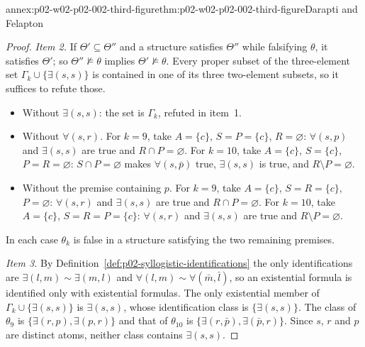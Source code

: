 \begin{annexitem}{annex:p02-w02-p02-002-third-figure}{thm:p02-w02-p02-002-third-figure}{Darapti and Felapton}
\begin{proof}
\emph{Item 2.} If \(\Theta'\subseteq\Theta''\) and a structure satisfies
\(\Theta''\) while falsifying \(\theta\), it satisfies \(\Theta'\); so
\(\Theta''\not\models\theta\) implies \(\Theta'\not\models\theta\). Every
proper subset of the three-element set
\(\Gamma_k\cup\{\exists(s,s)\}\) is contained in one of its three
two-element subsets, so it suffices to refute those.
\begin{itemize}
\item Without \(\exists(s,s)\): the set is \(\Gamma_k\), refuted in item~1.
\item Without \(\forall(s,r)\). For \(k=9\), take \(A=\{c\}\), \(S=P=\{c\}\),
 \(R=\varnothing\): \(\forall(s,p)\) and \(\exists(s,s)\) are true and
 \(R\cap P=\varnothing\). For \(k=10\), take \(A=\{c\}\), \(S=\{c\}\),
 \(P=R=\varnothing\): \(S\cap P=\varnothing\) makes \(\forall(s,\bar p)\)
 true, \(\exists(s,s)\) is true, and \(R\setminus P=\varnothing\).
\item Without the premise containing \(p\). For \(k=9\), take \(A=\{c\}\),
 \(S=R=\{c\}\), \(P=\varnothing\): \(\forall(s,r)\) and \(\exists(s,s)\) are
 true and \(R\cap P=\varnothing\). For \(k=10\), take \(A=\{c\}\),
 \(S=R=P=\{c\}\): \(\forall(s,r)\) and \(\exists(s,s)\) are true and
 \(R\setminus P=\varnothing\).
\end{itemize}
In each case \(\theta_k\) is false in a structure satisfying the two
remaining premises.

\emph{Item 3.} By Definition~\ref{def:p02-syllogistic-identifications} the
only identifications are \(\exists(l,m)\sim\exists(m,l)\) and
\(\forall(l,m)\sim\forall(\bar m,\bar l)\), so an existential formula is
identified only with existential formulas. The only existential member of
\(\Gamma_k\cup\{\exists(s,s)\}\) is \(\exists(s,s)\), whose identification
class is \(\{\exists(s,s)\}\). The class of \(\theta_9\) is
\(\{\exists(r,p),\exists(p,r)\}\) and that of \(\theta_{10}\) is
\(\{\exists(r,\bar p),\exists(\bar p,r)\}\). Since \(s\), \(r\) and \(p\) are
distinct atoms, neither class contains \(\exists(s,s)\).
\end{proof}
\end{annexitem}

